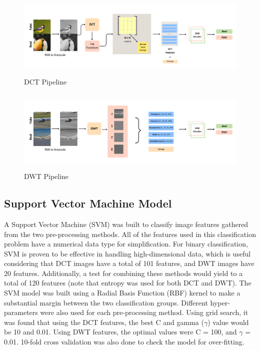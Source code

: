 \documentclass{icsthesis}
\begin{document}
\begin{mainmatter}
\begin{figure}[ht]
\begin{center}
    \includegraphics[width=440px,height=4cm]{imgs/1.png}
    \caption{DCT Pipeline}
    \label{Fig:image label}
\end{center}
\end{figure}

\begin{figure}[ht]
\begin{center}
    \includegraphics[width=440px,height=4cm]{imgs/2.png}
    \caption{DWT Pipeline}
    \label{Fig:image label}
\end{center}
\end{figure}

\subsection{Support Vector Machine Model}
A Support Vector Machine (SVM) was built to classify image features gathered from the two pre-processing methods. All of the features used in this classification problem have a numerical data type for simplification. For binary classification, SVM is proven to be effective in handling high-dimensional data, which is useful considering that DCT images have a total of 101 features, and DWT images have 20 features. Additionally, a test for combining these methods would yield to a total of 120 features (note that entropy was used for both DCT and DWT). The SVM model was built using a Radial Basis Function (RBF) kernel to make a substantial margin between the two classification groups. Different hyper-parameters were also used for each pre-processing method. Using grid search, it was found that using the DCT features, the best C and gamma ($\gamma$) value would be 10 and 0.01. Using DWT features, the optimal values were C = 100, and  $\gamma$ = 0.01. 10-fold cross validation was also done to check the model for over-fitting.  


\end{mainmatter}
\end{document}
